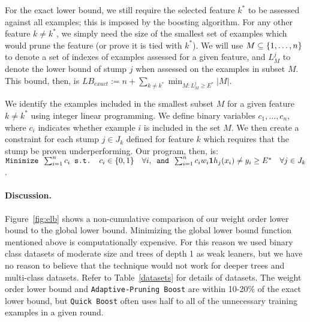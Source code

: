 For the exact lower bound, we still require the selected feature $k^*$ to be
assessed against all examples; this is imposed by the boosting algorithm.
For any other feature $k \ne k^*$, we simply need the size of the smallest
set of examples which would prune the feature (or prove it is tied with $k^*$).
We will use $M \subseteq \Set{1,\dots,n}$ to denote a set of indexes of examples
assessed for a given feature,
and $L^j_M$ to denote the lower bound of stump $j$ when assessed on the
examples in subset $M$.
This bound, then, is
$	LB_{exact} :=
	n + \sum_{k \ne k^*} \min_{M : L^j_M \ge E^*} |M|$.

We identify the examples included in the smallest subset $M$
for a given feature $k \ne k^*$ using integer linear programming.
We define binary variables $c_1,\dots,c_n$, where $c_i$ indicates whether example
$i$ is included in the set $M$.
We then create a constraint for each stump $j \in J_k$ defined for feature $k$
which requires that the stump be proven underperforming.
Our program, then, is:
$
	\texttt{Minimize } 
	 \sum_{i=1}^n c_i
	\texttt{ s.t. }
	c_i \in \Set{0,1}
		~~~ \forall i 
, \texttt{ and }
	\sum_{i=1}^n c_i w_i \1{ h_j(x_i) \ne y_i }
		\ge E^*
		~~~ \forall j \in J_k$.

\paragraph{Discussion.}
Figure~\ref{fig:elb} shows a non-cumulative comparison of our weight order lower bound to the global lower bound. Minimizing the global lower bound function mentioned above is computationally expensive. For this reason we used binary class datasets of moderate size and trees of depth 1 as weak leaners, but we have no reason to believe that the technique would not work for deeper trees and multi-class datasets. Refer to Table~\ref{datasets} for details of datasets.
The weight order lower bound and \texttt{Adaptive-Pruning Boost} 
are within 10-20\% of the exact lower bound,
but \texttt{Quick Boost} often uses half to all of the unnecessary
training examples in a given round.